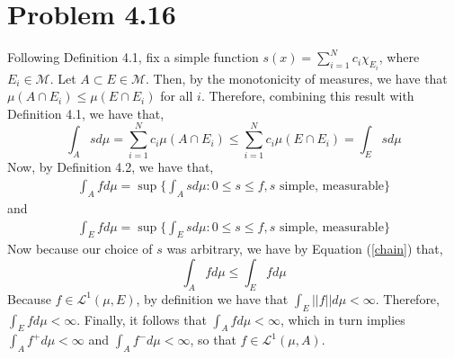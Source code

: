 \documentclass[letterpaper,12pt]{article}
\theoremstyle{definition}
\begin{document}
\newpage
  \section*{Problem 4.16}
  Following Definition 4.1, fix a simple function $s(x) = \sum_{i=1}^{N} c_i \chi_{E_{i}}$, where $E_i \in \mathcal{M}$. Let $A \subset E \in \mathcal{M}$. Then, by the monotonicity of measures, we have that $\mu(A \cap E_i) \leq \mu(E \cap E_i)$ for all $i$. Therefore, combining this result with Definition 4.1, we have that,
  \begin{equation} \label{chain}
  	\int_A  sd\mu = \sum_{i=1}^{N} c_i \mu(A \cap E_i) \leq \sum_{i=1}^{N} c_i \mu(E \cap E_i) = \int_E s d\mu
  \end{equation}
  Now, by Definition 4.2, we have that,
  \begin{align*}
  	\int_A f d\mu = \sup \{ \int_A s d\mu : 0 \leq s \leq f, s \text{ simple, measurable}  \}
  \end{align*}
  and
  \begin{align*}
  	\int_E f d\mu = \sup \{ \int_E s d\mu : 0 \leq s \leq f, s \text{ simple, measurable}  \}
  \end{align*}
  Now because our choice of $s$ was arbitrary, we have by Equation (\ref{chain}) that,
  \begin{equation}
   \int_A f d\mu \leq \int_E f d\mu
  \end{equation}
  Because $f \in \mathscr{L}^1(\mu, E)$, by definition we have that $\int_E ||f|| d\mu < \infty$. Therefore, $\int_E f d\mu <\infty$. Finally, it follows that $\int_A f d\mu < \infty$, which in turn implies $\int_A f^+ d\mu < \infty$ and $\int_A f^{-} d\mu < \infty$, so that $f \in \mathscr{L}^1 (\mu, A)$.
\end{document}
